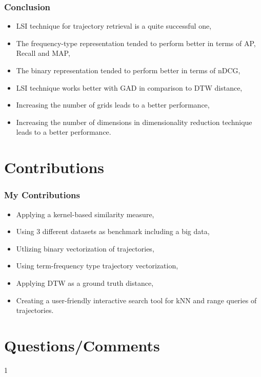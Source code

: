 \documentclass{beamer}
\begin{document}
\begin{frame}
\frametitle{Conclusion} 
\begin{block}{}
\begin{itemize}
\item LSI technique for trajectory retrieval is a quite successful one, \pause
\item The frequency-type representation tended to perform better in terms of AP, Recall and MAP, \pause
\item The binary representation tended to perform better in terms of nDCG, \pause
\item LSI technique works better with GAD in comparison to DTW distance, \pause
\item Increasing the number of grids leads to a better performance, \pause
\item Increasing the number of dimensions in dimensionality reduction technique leads to a better performance.
\end{itemize}
\end{block}
\end{frame}





\section{Contributions}

\begin{frame}
\frametitle{My Contributions} 
\begin{block}{}
\begin{itemize}
\item Applying a kernel-based similarity measure,
\item Using 3 different datasets as benchmark including a big data, 
\item Utlizing binary vectorization of trajectories,
\item Using term-frequency type trajectory vectorization, 
\item Applying DTW as a ground truth distance, 
\item Creating a user-friendly interactive search tool for kNN and range queries of trajectories. 
\end{itemize}

\end{block}
\end{frame}




\section*{Questions/Comments}
{\color{white}1}
\begin{center} 
{\huge {}}
\end{center}
\end{document}
